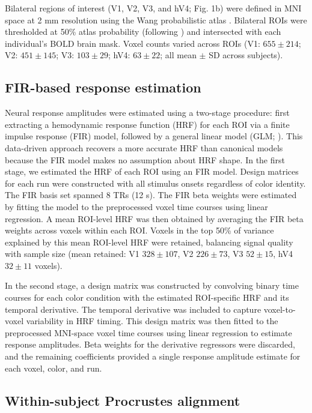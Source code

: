 Bilateral regions of interest (V1, V2, V3, and hV4; Fig. 1b) were defined in MNI space at 2 mm resolution using the Wang probabilistic atlas \cite{wang2015}. Bilateral ROIs were thresholded at 50\% atlas probability (following \cite{wang2015}) and intersected with each individual's BOLD brain mask. Voxel counts varied across ROIs (V1: $655 \pm 214$; V2: $451 \pm 145$; V3: $103 \pm 29$; hV4: $63 \pm 22$; all mean $\pm$ SD across subjects).

\subsection*{FIR-based response estimation}

Neural response amplitudes were estimated using a two-stage procedure: first extracting a hemodynamic response function (HRF) for each ROI via a finite impulse response (FIR) model, followed by a general linear model (GLM; \cite{dale1999, brouwer2009, brouwer2013}). This data-driven approach recovers a more accurate HRF than canonical models because the FIR model makes no assumption about HRF shape. In the first stage, we estimated the HRF of each ROI using an FIR model. Design matrices for each run were constructed with all stimulus onsets regardless of color identity. The FIR basis set spanned 8 TRs (12 s). The FIR beta weights were estimated by fitting the model to the preprocessed voxel time courses using linear regression. A mean ROI-level HRF was then obtained by averaging the FIR beta weights across voxels within each ROI. Voxels in the top 50\% of variance explained by this mean ROI-level HRF were retained, balancing signal quality with sample size (mean retained: V1 $328 \pm 107$, V2 $226 \pm 73$, V3 $52 \pm 15$, hV4 $32 \pm 11$ voxels).

In the second stage, a design matrix was constructed by convolving binary time courses for each color condition with the estimated ROI-specific HRF and its temporal derivative. The temporal derivative was included to capture voxel-to-voxel variability in HRF timing. This design matrix was then fitted to the preprocessed MNI-space voxel time courses using linear regression to estimate response amplitudes. Beta weights for the derivative regressors were discarded, and the remaining coefficients provided a single response amplitude estimate for each voxel, color, and run.

\subsection*{Within-subject Procrustes alignment}

